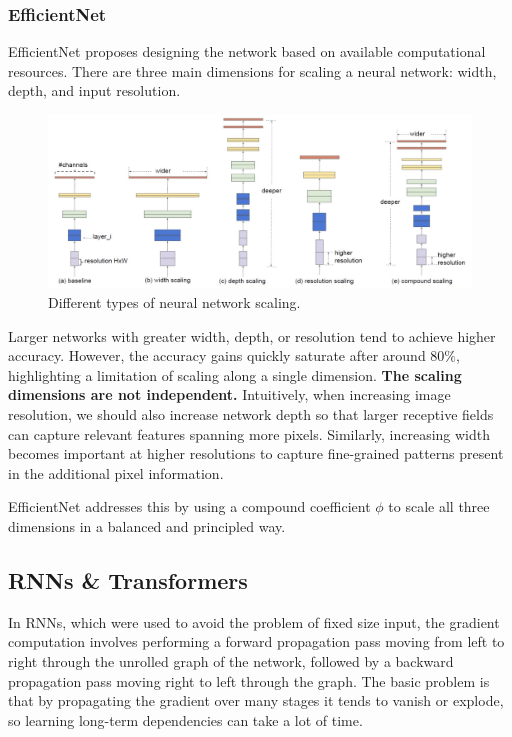 \subsubsection{EfficientNet}
EfficientNet proposes designing the network based on available computational resources.  
There are three main dimensions for scaling a neural network: width, depth, and input resolution.

\begin{figure}[htbp]
  \centering
  \includegraphics[width=0.9\linewidth]{./img/efficientnet.jpg}
  \caption{Different types of neural network scaling.}
\end{figure}

Larger networks with greater width, depth, or resolution tend to achieve higher accuracy. However, the accuracy gains quickly saturate after around $80\%$, highlighting a limitation of scaling along a single dimension.  
\textbf{The scaling dimensions are not independent.} Intuitively, when increasing image resolution, we should also increase network depth so that larger receptive fields can capture relevant features spanning more pixels.  
Similarly, increasing width becomes important at higher resolutions to capture fine-grained patterns present in the additional pixel information.

EfficientNet addresses this by using a compound coefficient $\phi$ to scale all three dimensions in a balanced and principled way.

\subsection{RNNs \& Transformers}

In RNNs, which were used to avoid the problem of fixed size input, the gradient computation involves performing a forward propagation pass moving from left to right through the unrolled graph of the network, followed by a backward propagation pass moving right to left through the graph.
The basic problem is that by propagating the gradient over many stages it tends to vanish or explode, so learning long-term dependencies can take a lot of time.

